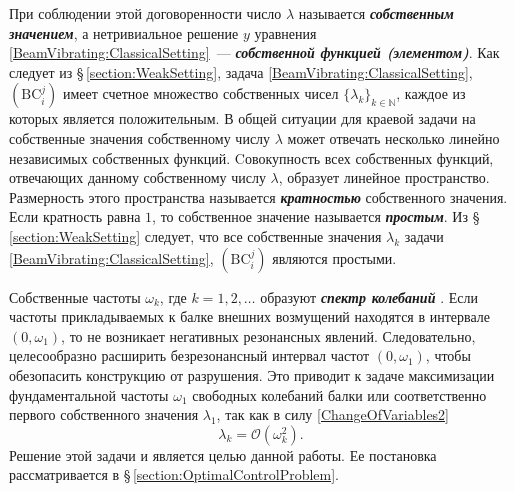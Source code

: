 %
%
%
При соблюдении этой договоренности число $\lambda$
называется \textbf{\emph{собственным значением}},
а нетривиальное решение $y$ уравнения
\eqref{BeamVibrating:ClassicalSetting}~---
\textbf{\emph{собственной функцией (элементом)}}.
%
%
%
Как следует из \S\,\ref{section:WeakSetting},
задача
\eqref{BeamVibrating:ClassicalSetting},
$(\mathrm{BC}_i^j)$
имеет счетное множество собственных чисел $\{ \lambda_k \}_{k \in \mathbb{N}}$,
каждое из которых является положительным.
%
%
%
В общей ситуации для краевой задачи на собственные значения
собственному числу $\lambda$ может отвечать несколько линейно независимых
собственных функций.
%
%
%
Cовокупность всех собственных функций,
отвечающих данному собственному числу $\lambda$,
образует линейное пространство.
%
%
%
Размерность этого пространства называется \textbf{\emph{кратностью}} собственного значения.
%
%
%
Если кратность равна $1$, то собственное значение
называется
\textbf{\emph{простым}}.
%
%
%
Из \S\,\ref{section:WeakSetting} следует,
что
все собственные значения $\lambda_k$ задачи
\eqref{BeamVibrating:ClassicalSetting},
$(\mathrm{BC}_i^j)$
являются простыми.
%
%
%
%
%
\par
Собственные частоты $\omega_k$, где $k = 1, 2, \ldots$ образуют
\textbf{\emph{спектр колебаний}} \cite{book:Timoshenko,book:Banichuk}.
%
%
%
Если частоты прикладываемых к балке внешних возмущений находятся в интервале
$(0, \omega_1)$,
то не возникает негативных резонансных явлений.
%
%
%
Следовательно,
целесообразно
расширить безрезонансный интервал частот $(0, \omega_1)$,
чтобы обезопасить конструкцию от разрушения.
%
%
%
Это приводит к задаче максимизации фундаментальной частоты $\omega_1$ свободных колебаний балки
или соответственно первого собственного значения $\lambda_1$,
так как в силу
\eqref{ChangeOfVariables2}
\[
\lambda_k =
\mathcal{O}(\omega_k^2).
\]
%
%
%
Решение этой задачи и является целью данной работы.
%
%
%
Ее постановка рассматривается в
\S\,\ref{section:OptimalControlProblem}.
